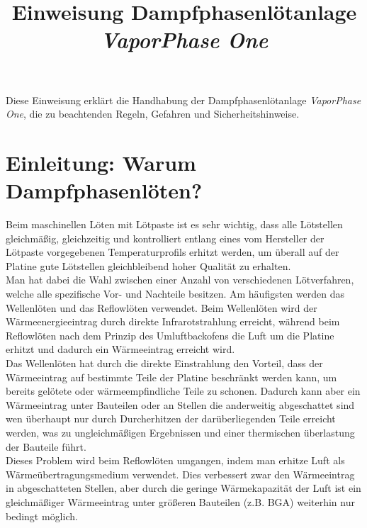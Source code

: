 \documentclass{\basedir/fablab-document}
\title{Einweisung Dampfphasenl{\"o}tanlage \textit{VaporPhase One}}
\makeatletter
\newcommand{\smaller}{\ifdim\f@size pt>10pt \small \fi}
\newcommand{\english}[1]{{\smaller \color{gray} \itshape #1}}
\renewcommand{\english}[1]{}
\makeatother
\begin{document}
	\maketitle

	Diese Einweisung erkl{\"a}rt die Handhabung der Dampfphasenl{\"o}tanlage \textit{VaporPhase One}, die zu beachtenden Regeln, Gefahren und Sicherheitshinweise.
	
	\english{This instruction explains use of the vapor phase soldering unit \textit{VaporPhase One}, and the associated rules, hazards and safety advice.}
	
	
	\section{Einleitung: Warum Dampfphasenl{\"o}ten?}
	
	Beim maschinellen L{\"o}ten mit L{\"o}tpaste ist es sehr wichtig, dass alle L{\"o}tstellen gleichm{\"a}{\ss}ig, gleichzeitig und kontrolliert entlang eines vom Hersteller der L{\"o}tpaste vorgegebenen Temperaturprofils erhitzt werden, um {\"u}berall auf der Platine gute L{\"o}tstellen gleichbleibend hoher Qualit{\"a}t zu erhalten. \\
	
	Man hat dabei die Wahl zwischen einer Anzahl von verschiedenen L{\"o}tverfahren, welche alle spezifische Vor- und Nachteile besitzen. Am h{\"a}ufigsten werden das Wellenl{\"o}ten und das Reflowl{\"o}ten verwendet. Beim Wellenl{\"o}ten wird der W{\"a}rmeenergieeintrag durch direkte Infrarotstrahlung erreicht, w{\"a}hrend beim Reflowl{\"o}ten nach dem Prinzip des Umluftbackofens die Luft um die Platine erhitzt und dadurch ein W{\"a}rmeeintrag erreicht wird.\\
	
	Das Wellenl{\"o}ten hat durch die direkte Einstrahlung den Vorteil, dass der W{\"a}rmeeintrag auf bestimmte Teile der Platine beschr{\"a}nkt werden kann, um bereits gel{\"o}tete oder w{\"a}rmeempfindliche Teile zu schonen. Dadurch kann aber ein W{\"a}rmeeintrag unter Bauteilen oder an Stellen die anderweitig abgeschattet sind wen {\"u}berhaupt nur durch Durcherhitzen der dar{\"u}berliegenden Teile erreicht werden, was zu ungleichm{\"a}{\ss}igen Ergebnissen und einer thermischen {\"u}berlastung der Bauteile f{\"u}hrt.\\
	
	Dieses Problem wird beim Reflowl{\"o}ten umgangen, indem man erhitze Luft als W{\"a}rme{\"u}bertragungsmedium verwendet. Dies verbessert zwar den W{\"a}rmeeintrag in abgeschatteten Stellen, aber durch die geringe W{\"a}rmekapazit{\"a}t der Luft ist ein gleichm{\"a}{\ss}iger W{\"a}rmeeintrag unter gr{\"o}{\ss}eren Bauteilen (z.B. BGA) weiterhin nur bedingt m{\"o}glich.\\
	
\end{document}

